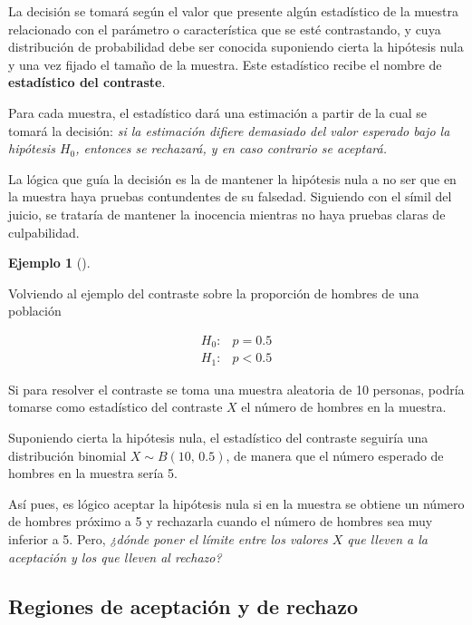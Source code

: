 \documentclass[
  a4paper,
]{scrreport}
\theoremstyle{definition}
\theoremstyle{definition}
\newtheorem{example}{Ejemplo}[chapter]
\theoremstyle{plain}
\theoremstyle{remark}
\begin{document}
La decisión se tomará según el valor que presente algún estadístico de
la muestra relacionado con el parámetro o característica que se esté
contrastando, y cuya distribución de probabilidad debe ser conocida
suponiendo cierta la hipótesis nula y una vez fijado el tamaño de la
muestra. Este estadístico recibe el nombre de \textbf{estadístico del
contraste}.

Para cada muestra, el estadístico dará una estimación a partir de la
cual se tomará la decisión: \emph{si la estimación difiere demasiado del
valor esperado bajo la hipótesis \(H_0\), entonces se rechazará, y en
caso contrario se aceptará.}

La lógica que guía la decisión es la de mantener la hipótesis nula a no
ser que en la muestra haya pruebas contundentes de su falsedad.
Siguiendo con el símil del juicio, se trataría de mantener la inocencia
mientras no haya pruebas claras de culpabilidad.

\begin{example}[]\protect\hypertarget{exm-estadistico-contraste}{}\label{exm-estadistico-contraste}

Volviendo al ejemplo del contraste sobre la proporción de hombres de una
población

\begin{align*}
H_0: & p=0.5 \\
H_1: & p<0.5
\end{align*}

Si para resolver el contraste se toma una muestra aleatoria de 10
personas, podría tomarse como estadístico del contraste \(X\) el número
de hombres en la muestra.

Suponiendo cierta la hipótesis nula, el estadístico del contraste
seguiría una distribución binomial \(X\sim B(10,\,0.5)\), de manera que
el número esperado de hombres en la muestra sería 5.

Así pues, es lógico aceptar la hipótesis nula si en la muestra se
obtiene un número de hombres próximo a 5 y rechazarla cuando el número
de hombres sea muy inferior a 5. Pero, \emph{¿dónde poner el límite
entre los valores \(X\) que lleven a la aceptación y los que lleven al
rechazo?}

\end{example}

\hypertarget{regiones-de-aceptaciuxf3n-y-de-rechazo}{%
\subsection{Regiones de aceptación y de
rechazo}\label{regiones-de-aceptaciuxf3n-y-de-rechazo}}
\end{document}
